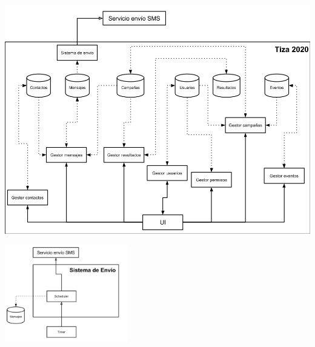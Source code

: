 \documentclass[a4paper, 11pt]{article}
\begin{document}
\centerline{\includegraphics[width=1\textwidth]{./diagramas/ArquitecturaTP1.png}}
\centerline{\includegraphics[width=0.4\textwidth]{./diagramas/ArqTP1SistEnvio.png}}
\end{document}
